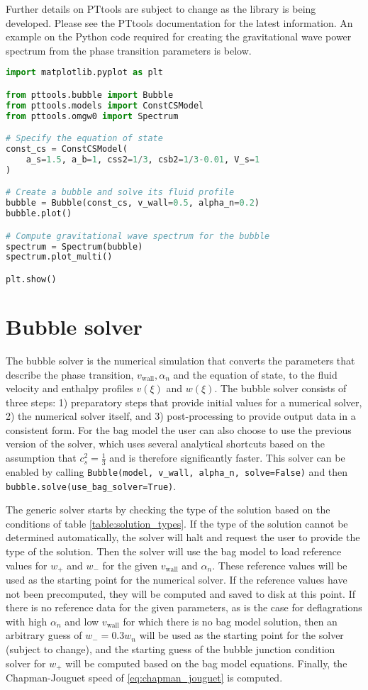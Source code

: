 Further details on PTtools are subject to change as the library is being developed.
Please see the PTtools documentation for the latest information.
An example on the Python code required for creating the gravitational wave power spectrum from the phase transition parameters is below.
\begin{lstlisting}[language=Python]
import matplotlib.pyplot as plt

from pttools.bubble import Bubble
from pttools.models import ConstCSModel
from pttools.omgw0 import Spectrum

# Specify the equation of state
const_cs = ConstCSModel(
    a_s=1.5, a_b=1, css2=1/3, csb2=1/3-0.01, V_s=1
)

# Create a bubble and solve its fluid profile
bubble = Bubble(const_cs, v_wall=0.5, alpha_n=0.2)
bubble.plot()

# Compute gravitational wave spectrum for the bubble
spectrum = Spectrum(bubble)
spectrum.plot_multi()

plt.show()
\end{lstlisting}


\section{Bubble solver}
The bubble solver is the numerical simulation that converts the parameters that describe the phase transition, $v_{\text{wall}}, \alpha_n$ and the equation of state, to the fluid velocity and enthalpy profiles $v(\xi)$ and $w(\xi)$.
The bubble solver consists of three steps:
1) preparatory steps that provide initial values for a numerical solver,
2) the numerical solver itself, and
3) post-processing to provide output data in a consistent form.
For the bag model the user can also choose to use the previous version of the solver,
which uses several analytical shortcuts based on the assumption that $c_s^2 = \frac{1}{3}$ and is therefore significantly faster.
This solver can be enabled by calling \verb|Bubble(model, v_wall, alpha_n, solve=False)| and then \verb|bubble.solve(use_bag_solver=True)|.

The generic solver starts by checking the type of the solution based on the conditions of table \ref{table:solution_types}.
If the type of the solution cannot be determined automatically, the solver will halt and request the user to provide the type of the solution.
Then the solver will use the bag model to load reference values for $w_+$ and $w_-$ for the given $v_\text{wall}$ and $\alpha_n$.
These reference values will be used as the starting point for the numerical solver.
If the reference values have not been precomputed,
they will be computed and saved to disk at this point.
If there is no reference data for the given parameters,
as is the case for deflagrations with high $\alpha_n$ and low $v_\text{wall}$ for which there is no bag model solution,
then an arbitrary guess of $w_- = 0.3 w_n$ will be used as the starting point for the solver (subject to change),
and the starting guess of the bubble junction condition solver for $w_+$ will be computed based on the bag model equations.
Finally, the Chapman-Jouguet speed of \eqref{eq:chapman_jouguet} is computed.

